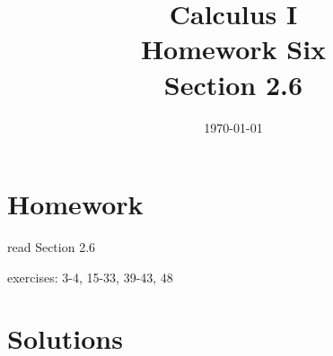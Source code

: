 \documentclass[letterpaper, landscape]{exam}
\title{Calculus I \\ Homework Six \\ Section 2.6}
\author{}
\date{\today}
\begin{document}
  \maketitle

  \section{Homework}
    \begin{itemize*}
      \item read Section 2.6
      \item exercises: 3-4, 15-33, 39-43, 48
    \end{itemize*}

  \ifprintanswers

  \section{Solutions}
\end{document}
